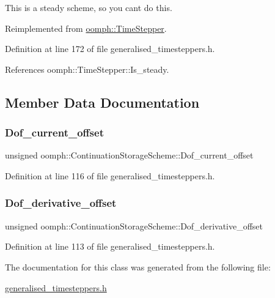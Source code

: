 This is a steady scheme, so you can\textquotesingle{}t do this. 



Reimplemented from \hyperlink{classoomph_1_1TimeStepper_aada05f89e86aae352bd5b32bfb173b18}{oomph\+::\+Time\+Stepper}.



Definition at line 172 of file generalised\+\_\+timesteppers.\+h.



References oomph\+::\+Time\+Stepper\+::\+Is\+\_\+steady.



\subsection{Member Data Documentation}
\mbox{\label{classoomph_1_1ContinuationStorageScheme_a8b0d1e52fa6ff062f58b4d37ba5fbc7f}} 
\subsubsection{\texorpdfstring{Dof\+\_\+current\+\_\+offset}{Dof\_current\_offset}}
{\footnotesize\ttfamily unsigned oomph\+::\+Continuation\+Storage\+Scheme\+::\+Dof\+\_\+current\+\_\+offset\hspace{0.3cm}{\ttfamily [private]}}



Definition at line 116 of file generalised\+\_\+timesteppers.\+h.

\mbox{\label{classoomph_1_1ContinuationStorageScheme_aafee8dedf6e4787bc3e65ba52eab26dc}} 
\subsubsection{\texorpdfstring{Dof\+\_\+derivative\+\_\+offset}{Dof\_derivative\_offset}}
{\footnotesize\ttfamily unsigned oomph\+::\+Continuation\+Storage\+Scheme\+::\+Dof\+\_\+derivative\+\_\+offset\hspace{0.3cm}{\ttfamily [private]}}



Definition at line 113 of file generalised\+\_\+timesteppers.\+h.



The documentation for this class was generated from the following file\+:\begin{DoxyCompactItemize}
\item 
\hyperlink{generalised__timesteppers_8h}{generalised\+\_\+timesteppers.\+h}\end{DoxyCompactItemize}
